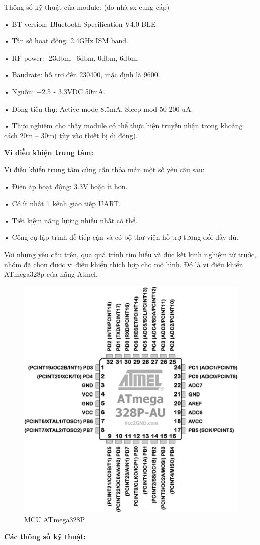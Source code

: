 Thông số kỹ thuật của module: (do nhà sx cung cấp)

• BT version: Bluetooth Specification V4.0 BLE.

• Tần số hoạt động: 2.4GHz ISM band.

• RF power: -23dbm, -6dbm, 0dbm, 6dbm.

• Baudrate: hỗ trợ đến 230400, mặc định là 9600.

• Nguồn: +2.5 - 3.3VDC 50mA.

• Dòng tiêu thụ: Active mode 8.5mA, Sleep mod 50-200 uA.

• Thực nghiệm cho thấy module có thể thực hiện truyền nhận trong khoảng cách 20m – 30m( tùy vào thiết bị di động).

\textbf{Vi điều khiện trung tâm:}

Vi điều khiển trung tâm cũng cần thỏa mản một số yêu cầu sau:

• Điện áp hoạt động: 3.3V hoặc ít hơn.

• Có ít nhất 1 kênh giao tiếp UART.

• Tiết kiệm năng lượng nhiều nhất có thể.

• Công cụ lập trình dễ tiếp cận và có bộ thư viện hỗ trợ tương đối đầy đủ.

Với những yêu cầu trên, qua quá trình tìm hiểu và đúc kết kinh nghiệm từ trước, nhóm đã chọn được vi điều khiển thích hợp cho mô hình. Đó là vi điều khiển ATmega328p của hãng Atmel.

\begin{figure}[h]
	\centering    
	\includegraphics[width=1.0\textwidth]{atmega}
	\caption[MCU ATmega328P]{MCU ATmega328P}
	\label{fig: atmega}
\end{figure}
\textbf{Các thông số kỹ thuật:}

